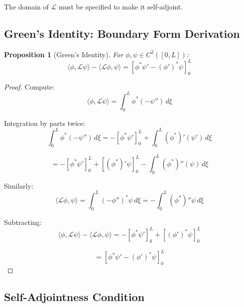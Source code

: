 \documentclass[11pt,a4paper]{article}
\theoremstyle{definition}
\theoremstyle{plain}
\newtheorem{proposition}{Proposition}[section]
\theoremstyle{remark}
\begin{document}
The domain of $\mathcal{L}$ must be specified to make it self-adjoint.

\subsection{Green's Identity: Boundary Form Derivation}

\begin{proposition}[Green's Identity]
\label{prop:green}
For $\phi, \psi \in C^2([0,L])$:
\begin{equation}
\langle \phi, \mathcal{L}\psi \rangle - \langle \mathcal{L}\phi, \psi \rangle
= \left[\phi^*\psi' - (\phi')^*\psi\right]_0^L
\label{eq:green-identity}
\end{equation}
\end{proposition}

\begin{proof}
Compute:
\begin{equation}
\langle \phi, \mathcal{L}\psi \rangle = \int_0^L \phi^*(-\psi'') \, d\xi
\label{eq:green-1}
\end{equation}

Integration by parts twice:
\begin{equation}
\int_0^L \phi^*(-\psi'') \, d\xi = -[\phi^*\psi']_0^L + \int_0^L (\phi^*)'(\psi') \, d\xi
\label{eq:green-2}
\end{equation}

\begin{equation}
= -[\phi^*\psi']_0^L + [(\phi^*)'\psi]_0^L - \int_0^L (\phi^*)''(\psi) \, d\xi
\label{eq:green-3}
\end{equation}

Similarly:
\begin{equation}
\langle \mathcal{L}\phi, \psi \rangle = \int_0^L (-\phi'')^* \psi \, d\xi
= -\int_0^L (\phi^*)''\psi \, d\xi
\label{eq:green-4}
\end{equation}

Subtracting:
\begin{equation}
\langle \phi, \mathcal{L}\psi \rangle - \langle \mathcal{L}\phi, \psi \rangle
= -[\phi^*\psi']_0^L + [(\phi')^*\psi]_0^L
\label{eq:green-5}
\end{equation}

\begin{equation}
= \left[\phi^*\psi' - (\phi')^*\psi\right]_0^L
\label{eq:green-6}
\end{equation}
\end{proof}

\subsection{Self-Adjointness Condition}
\end{document}
